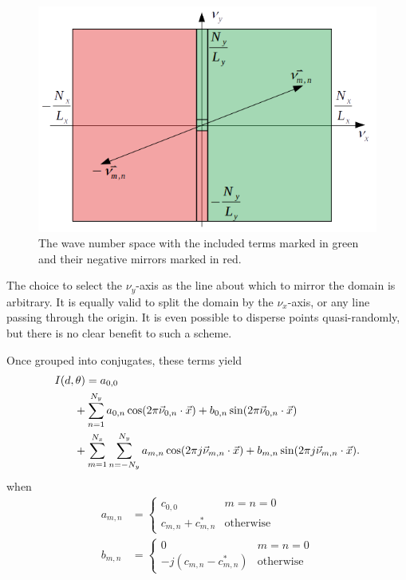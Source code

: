 \documentclass{article}
\def\x{\vec{x}}
\begin{document}
\begin{figure}
\centering
\includegraphics[width=0.9\linewidth]{figures/wavenumbers}
\caption{The wave number space with the included terms marked in green and their negative mirrors marked in red.}\label{fig:wavenumbers}
\end{figure}

The choice to select the $\nu_y$-axis as the line about which to mirror the domain is arbitrary.  It is equally valid to split the domain by the $\nu_x$-axis, or any line passing through the origin.  It is even possible to disperse points quasi-randomly, but there is no clear benefit to such a scheme.

Once grouped into conjugates, these terms yield
\begin{align}
I(d,\theta) &= a_{0,0} \nonumber\\
& \hspace{-1em} + \sum_{n=1}^{N_y} a_{0,n} \cos(2\pi \vec{\nu}_{0,n} \cdot \x) + b_{0,n} \sin(2\pi \vec{\nu}_{0,n} \cdot \x)\nonumber\\
& \hspace{-1em} + \sum_{m=1}^{N_x}\sum_{n=-N_y}^{N_y} a_{m,n} \cos(2\pi j \vec{\nu}_{m,n} \cdot \x) + b_{m,n} \sin(2\pi j \vec{\nu}_{m,n} \cdot \x).
\end{align}
when
\begin{align}
a_{m,n} &= \left\{\begin{array}{c|l}
c_{0,0} & m=n=0\\
c_{m,n} + c_{m,n}^*& \mathrm{otherwise}
\end{array}\right.\\
b_{m,n} &= \left\{\begin{array}{c|l}
0 & m=n=0\\
-j(c_{m,n} - c_{m,n}^*) & \mathrm{otherwise}
\end{array}\right.
\end{align}
\end{document}
